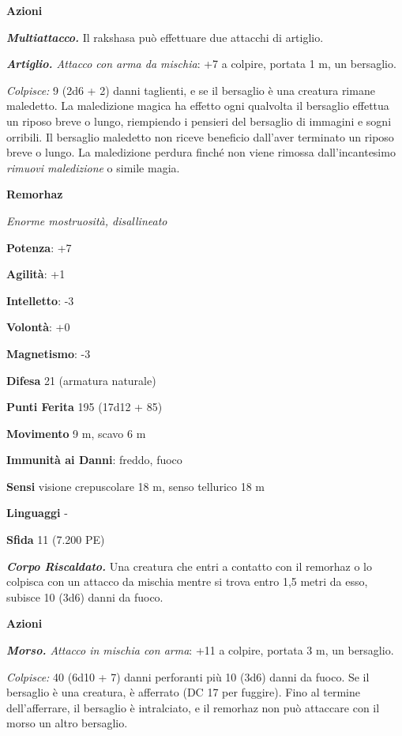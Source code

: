 \begin{multicols}{2}
\smallskip\textbf{Azioni}

\emph{\textbf{Multiattacco.}} Il rakshasa può effettuare due attacchi di
artiglio.

\emph{\textbf{Artiglio.} Attacco con arma da mischia}: +7 a colpire,
portata 1 m, un bersaglio.

\emph{Colpisce:} 9 (2d6 + 2) danni taglienti, e se il bersaglio è una
creatura rimane maledetto. La maledizione magica ha effetto ogni
qualvolta il bersaglio effettua un riposo breve o lungo, riempiendo i
pensieri del bersaglio di immagini e sogni orribili. Il bersaglio
maledetto non riceve beneficio dall'aver terminato un riposo breve o
lungo. La maledizione perdura finché non viene rimossa dall'incantesimo
\emph{rimuovi maledizione} o simile magia.



\textbf{Remorhaz}

\emph{Enorme mostruosità, disallineato}

\textbf{Potenza}: +7

\textbf{Agilità}: +1

\textbf{Intelletto}: -3

\textbf{Volontà}: +0

\textbf{Magnetismo}: -3

\textbf{Difesa} 21 (armatura naturale)

\textbf{Punti Ferita} 195 (17d12 + 85)

\textbf{Movimento} 9 m, scavo 6 m

\textbf{Immunità ai Danni}: freddo, fuoco

\textbf{Sensi} visione crepuscolare 18 m, senso tellurico 18 m

\textbf{Linguaggi} -

\textbf{Sfida} 11 (7.200 PE)\smallskip

\emph{\textbf{Corpo Riscaldato.}} Una creatura che entri a contatto con
il remorhaz o lo colpisca con un attacco da mischia mentre si trova
entro 1,5 metri da esso, subisce 10 (3d6) danni da fuoco.

\smallskip\textbf{Azioni}

\emph{\textbf{Morso.} Attacco in mischia con arma}: +11 a colpire,
portata 3 m, un bersaglio.

\emph{Colpisce:} 40 (6d10 + 7) danni perforanti più 10 (3d6) danni da
fuoco. Se il bersaglio è una creatura, è afferrato (DC 17 per fuggire).
Fino al termine dell'afferrare, il bersaglio è intralciato, e il
remorhaz non può attaccare con il morso un altro bersaglio.


\end{multicols}
